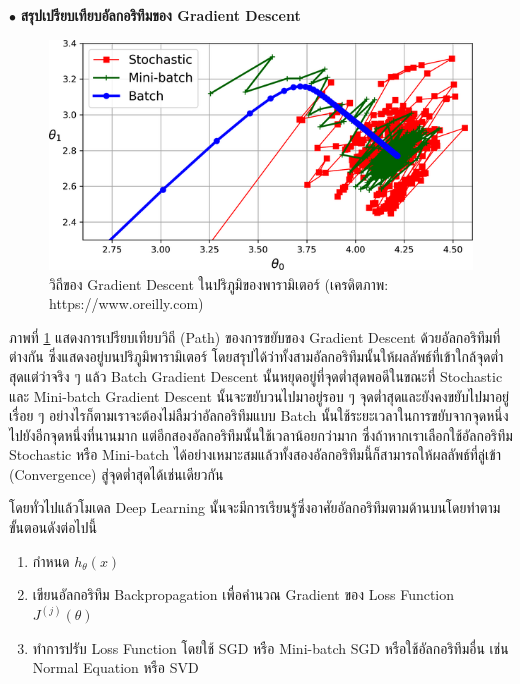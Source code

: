 \vspace{1em}

\noindent $\bullet$ \textbf{สรุปเปรียบเทียบอัลกอริทึมของ Gradient Descent}

\begin{figure}[H]
    \centering
    \includegraphics[width=0.8\linewidth]{fig/gradient_descent_path.png}
    \caption{วิถีของ Gradient Descent ในปริภูมิของพารามิเตอร์ (เครดิตภาพ: https://www.oreilly.com)}
    \label{fig:gradient_descent_path}
\end{figure}

ภาพที่ \ref{fig:gradient_descent_path} แสดงการเปรียบเทียบวิถี (Path) ของการขยับของ Gradient Descent ด้วยอัลกอริทึมที่ต่างกัน ซึ่งแสดงอยู่บนปริภูมิพารามิเตอร์ โดยสรุปได้ว่าทั้งสามอัลกอริทึมนั้นให้ผลลัพธ์ที่เข้าใกล้จุดต่ำสุดแต่ว่าจริง ๆ แล้ว Batch Gradient Descent นั้นหยุดอยู่ที่จุดต่ำสุดพอดีในขณะที่ Stochastic และ Mini-batch Gradient Descent นั้นจะขยับวนไปมาอยู่รอบ ๆ จุดต่ำสุดและยังคงขยับไปมาอยู่เรื่อย ๆ อย่างไรก็ตามเราจะต้องไม่ลืมว่าอัลกอริทึมแบบ Batch นั้นใช้ระยะเวลาในการขยับจากจุดหนึ่งไปยังอีกจุดหนึ่งที่นานมาก แต่อีกสองอัลกอริทึมนั้นใช้เวลาน้อยกว่ามาก ซึ่งถ้าหากเราเลือกใช้อัลกอริทึม Stochastic หรือ Mini-batch ได้อย่างเหมาะสมแล้วทั้งสองอัลกอริทึมนี้ก็สามารถให้ผลลัพธ์ที่ลู่เข้า (Convergence) สู่จุดต่ำสุดได้เช่นเดียวกัน

โดยทั่วไปแล้วโมเดล Deep Learning นั้นจะมีการเรียนรู้ซึ่งอาศัยอัลกอริทึมตามด้านบนโดยทำตามขั้นตอนดังต่อไปนี้
%
\begin{enumerate}[topsep=0pt,noitemsep]\setlength\itemsep{0.5em}
    \item กำหนด $h_\theta(x)$

    \item เขียนอัลกอริทึม Backpropagation เพื่อคำนวณ Gradient ของ Loss Function $J^{(j)}(\theta)$

    \item ทำการปรับ Loss Function โดยใช้ SGD หรือ Mini-batch SGD หรือใช้อัลกอริทึมอื่น เช่น Normal Equation หรือ SVD
\end{enumerate}

